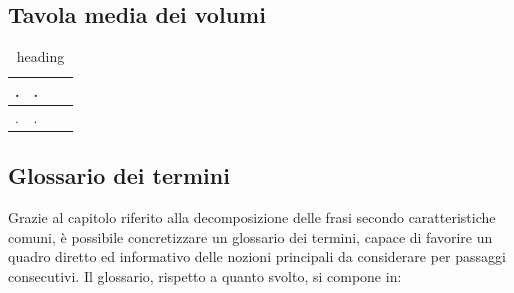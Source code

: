 \documentclass{article}
\begin{document}
\subsection{Tavola media dei volumi}
\large
\begin{table}[h]
    \centering
    \begin{tabularx}{\textwidth}{|X|X|X|X|}
        \hline
        . & . \\
        \hline
        . & . \\
    \end{tabularx}
    \caption{heading}
\end{table}

\subsection{Glossario dei termini}
\large
Grazie al capitolo riferito alla decomposizione delle frasi secondo caratteristiche comuni, è possibile concretizzare un glossario dei termini, capace di favorire un quadro diretto ed informativo delle nozioni principali da considerare per passaggi consecutivi. Il glossario, rispetto a quanto svolto, si compone in:
\end{document}
